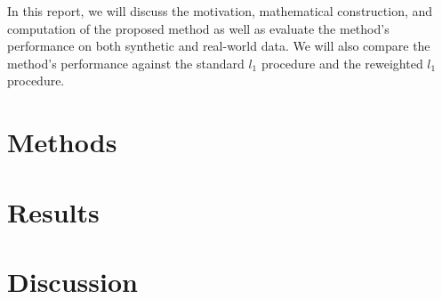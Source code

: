 \documentclass{uwstat572}
\begin{document}
In this report, we will discuss the motivation, mathematical construction, and computation of the proposed method as well as evaluate the method's performance on both synthetic and real-world data.  We will also compare the method's performance against the standard $l_1$ procedure and the reweighted $l_1$ procedure.  

\section{Methods}

\section{Results}

\section{Discussion}


\end{document}
